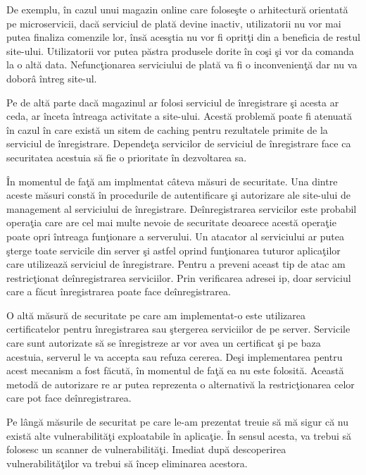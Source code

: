 \documentclass[a4paper,12pt]{report}
\begin{document}
De exemplu, \^in cazul unui
magazin online care folose\c ste o arhitectur\u a orientat\u a pe microservicii, dac\u a
serviciul de plat\u a devine inactiv, utilizatorii nu vor mai putea finaliza comenzile lor, \^ins\u a
aces\c stia nu vor fi oprit\c ti din a beneficia de restul site-ului. Utilizatorii vor putea p\u astra 
produsele dorite \^in co\c si \c si vor da comanda la o alt\u a data. Nefunc\c tionarea 
serviciului de plat\u a va fi o inconvenien\c t\u a dar nu va dobor\^a \^intreg site-ul.

Pe de alt\u a parte dac\u a magazinul ar folosi serviciul de \^inregistrare \c si acesta ar ceda,
ar \^inceta \^intreaga activitate a site-ului. Acest\u a problem\u a poate fi atenuat\u a \^in cazul 
\^in care exist\u a un sitem de caching pentru rezultatele primite de la serviciul de \^inregistrare.
Depende\c ta servicilor de serviciul de \^inregistrare face ca securitatea acestuia s\u a fie 
o prioritate \^in dezvoltarea sa.

\^In momentul de fa\c t\u a am implmentat c\^ateva m\u asuri de securitate. Una dintre aceste 
m\u asuri const\u a \^in procedurile de autentificare \c si autorizare ale site-ului de management 
al serviciului de \^inregistrare. De\^inregistrarea servicilor este probabil opera\c tia care are 
cel mai multe nevoie de securitate deoarece acest\u a opera\c tie poate opri \^intreaga fun\c tionare 
a serverului. Un atacator al serviciului ar putea \c sterge toate servicile din server \c si astfel 
oprind fun\c tionarea tuturor aplica\c tilor care utilizeaz\u a serviciul de \^inregistrare.
Pentru a preveni aceast tip de atac am restric\c tionat de\^inregistrarea serviciilor.
Prin verificarea adresei ip, doar serviciul care a f\u acut \^inregistrarea poate face de\^inregistrarea.

O alt\u a m\u asur\u a de securitate pe care am implementat-o este utilizarea certificatelor pentru 
\^inregistrarea sau \c stergerea serviciilor de pe server. Servicile care sunt autorizate s\u a se \^inregistreze 
ar vor avea un certificat \c si pe baza acestuia, serverul le va accepta sau refuza cererea.
De\c si implementarea pentru acest mecanism a fost f\u acut\u a, \^in momentul de fa\c t\u a
ea nu este folosit\u a. Aceast\u a metod\u a de autorizare re ar putea reprezenta o alternativ\u a la restric\c tionarea 
celor care pot face de\^inregistrarea.

Pe l\^ang\u a m\u asurile de securitat pe care le-am prezentat treuie s\u a m\u a sigur c\u a nu exist\u a
alte vulnerabilit\u a\c ti exploatabile \^in aplica\c tie. \^In sensul acesta, va trebui s\u a folosesc 
un scanner de vulnerabilit\u a\c ti. Imediat dup\u a descoperirea vulnerabilit\u a\c tilor va trebui s\u a 
\^incep eliminarea acestora.
\end{document}
